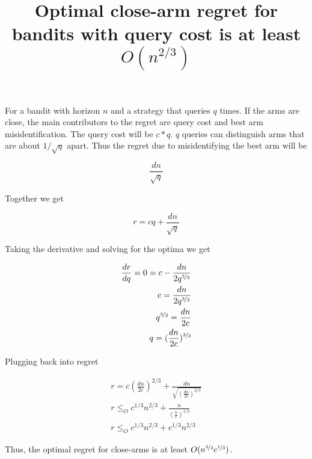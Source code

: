 \documentclass{article}
\begin{document}
\title{Optimal close-arm regret for bandits with query cost is at least $O(n^{2/3})$ }
\maketitle

For a bandit with horizon $n$ and a strategy that queries $q$ times. If the arms are close, the main contributors to the regret are query cost and best arm misidentification. The query cost will be $c*q$. $q$ queries can distinguish arms that are about $1/\sqrt{q}$ apart. Thus the regret due to misidentifying the best arm will be

$$
\frac{ d n}{\sqrt{q}}
$$

Together we get 

$$
r = cq + \frac{ d n}{\sqrt{q}}
$$

Taking the derivative and solving for the optima we get 

\begin{align}
\frac{dr}{dq} = 0 = c - \frac{d n}{2 q^{\nicefrac{3}{2}} } 
\\c = \frac{d n}{2 q^{\nicefrac{3}{2}}} 
\\q^{\nicefrac{3}{2}} = \frac{d n}{2 c} 
\\q = (\frac{d n}{2 c})^{\nicefrac{2}{3} }
\end{align}

Plugging back into regret

\begin{align}
r = c (\frac{d n}{2 c})^{2/3} + \frac{d n}{\sqrt{(\frac{d n}{2 c})^{2/3}} }
\\ r \le_O c^{1/3} n^{2/3} + \frac{ n}{(\frac{n}{c})^{1/3}}
\\ r \le_O c^{1/3} n^{2/3} + c^{1/3} n^{2/3} 
\end{align}

Thus, the optimal regret for close-arms is at least $O(n^{\nicefrac{2}{3}} c^{\nicefrac{1}{3}})$. 
\end{document}

